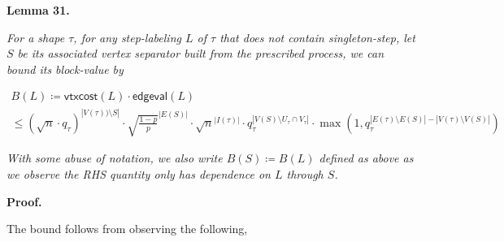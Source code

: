 

\par\medskip\noindent\textbf{
\textbf{Lemma 31}\textbf{.}
}\par



\emph{For a shape $\tau$, for any step-labeling $L$ of $\tau$ that does not contain singleton-step, let $S$ be its associated vertex separator built from the prescribed process, we can bound its block-value by}\par




\[\begin{gathered}
\displaystyle B(L) \displaystyle\coloneqq\mathsf{vtxcost}(L)\cdot\mathsf{edgeval}(L) \\
\displaystyle\leq(\sqrt{n}\cdot q_{\tau})^{|V(\tau))\setminus S|}\cdot\sqrt{\frac{1-p}{p}}^{|E(S)|}\cdot\sqrt{n}^{|I(\tau)|}\cdot q_{\tau}^{|V(S)\setminus
U_{\tau}\cap V_{\tau}|}\cdot\max(1,q_{\tau}^{|E(\tau)\setminus E(S)|-|V(\tau)\setminus V(S)|})
\end{gathered}\]


\emph{With some abuse of notation, we also write $B(S)\coloneqq B(L)$ defined as above as we observe the RHS quantity only has dependence on $L$ through $S$.}\par






\par\medskip\noindent\textbf{Proof.}\par




The bound follows from observing the following,\par


